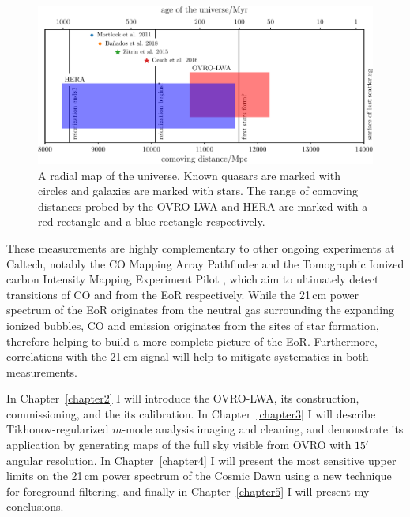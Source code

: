 \begin{bibunit}
\begin{figure}[t]
    \centering
    \includegraphics[width=\textwidth]{figures/chapter1/history-of-the-universe/history-of-the-universe}
    \caption{
        A radial map of the universe. Known quasars are marked with circles and galaxies are marked
        with stars. The range of comoving distances probed by the OVRO-LWA and HERA are marked with
        a red rectangle and a blue rectangle respectively.
    }
    \label{fig:history-of-the-universe}
\end{figure}

These measurements are highly complementary to other ongoing experiments at Caltech, notably the CO
Mapping Array Pathfinder \citep[COMAP;][]{2016AAS...22742606C} and the Tomographic Ionized carbon
Intensity Mapping Experiment Pilot \citep[TIME-Pilot;][]{2017AAS...22912501C}, which aim to
ultimately detect transitions of CO and  from the EoR respectively. While the 21\,cm power
spectrum of the EoR originates from the neutral gas surrounding the expanding ionized bubbles, CO
and  emission originates from the sites of star formation, therefore helping to build a
more complete picture of the EoR.  Furthermore, correlations with the 21\,cm signal will help to
mitigate systematics in both measurements.

In Chapter~\ref{chapter2} I will introduce the OVRO-LWA, its construction, commissioning, and the
its calibration. In Chapter~\ref{chapter3} I will describe Tikhonov-regularized $m$-mode analysis
imaging and cleaning, and demonstrate its application by generating maps of the full sky visible
from OVRO with $15\mbox{$^\prime$}$ angular resolution. In Chapter~\ref{chapter4} I will present the most
sensitive upper limits on the 21\,cm power spectrum of the Cosmic Dawn using a new technique for
foreground filtering, and finally in Chapter~\ref{chapter5} I will present my conclusions.

\end{bibunit}

